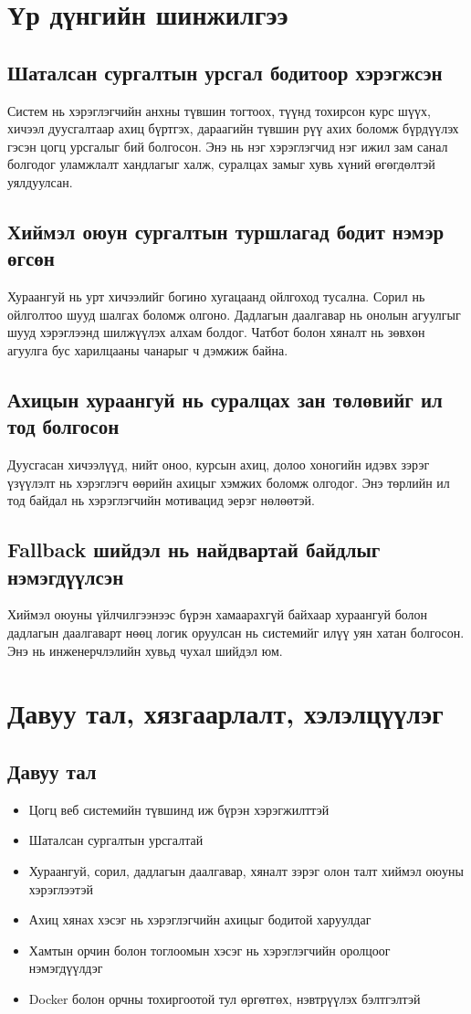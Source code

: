 \section{Үр дүнгийн шинжилгээ}
\subsection{Шаталсан сургалтын урсгал бодитоор хэрэгжсэн}
Систем нь хэрэглэгчийн анхны түвшин тогтоох, түүнд тохирсон курс шүүх, хичээл дуусгалтаар ахиц бүртгэх, дараагийн түвшин рүү ахих боломж бүрдүүлэх гэсэн цогц урсгалыг бий болгосон. Энэ нь нэг хэрэглэгчид нэг ижил зам санал болгодог уламжлалт хандлагыг халж, суралцах замыг хувь хүний өгөгдөлтэй уялдуулсан.

\subsection{Хиймэл оюун сургалтын туршлагад бодит нэмэр өгсөн}
Хураангуй нь урт хичээлийг богино хугацаанд ойлгоход тусална. Сорил нь ойлголтоо шууд шалгах боломж олгоно. Дадлагын даалгавар нь онолын агуулгыг шууд хэрэглээнд шилжүүлэх алхам болдог. Чатбот болон хяналт нь зөвхөн агуулга бус харилцааны чанарыг ч дэмжиж байна.

\subsection{Ахицын хураангуй нь суралцах зан төлөвийг ил тод болгосон}
Дуусгасан хичээлүүд, нийт оноо, курсын ахиц, долоо хоногийн идэвх зэрэг үзүүлэлт нь хэрэглэгч өөрийн ахицыг хэмжих боломж олгодог. Энэ төрлийн ил тод байдал нь хэрэглэгчийн мотивацид эерэг нөлөөтэй.

\subsection{Fallback шийдэл нь найдвартай байдлыг нэмэгдүүлсэн}
Хиймэл оюуны үйлчилгээнээс бүрэн хамаарахгүй байхаар хураангуй болон дадлагын даалгаварт нөөц логик оруулсан нь системийг илүү уян хатан болгосон. Энэ нь инженерчлэлийн хувьд чухал шийдэл юм.

\section{Давуу тал, хязгаарлалт, хэлэлцүүлэг}
\subsection{Давуу тал}
\begin{itemize}
\item Цогц веб системийн түвшинд иж бүрэн хэрэгжилттэй
\item Шаталсан сургалтын урсгалтай
\item Хураангуй, сорил, дадлагын даалгавар, хяналт зэрэг олон талт хиймэл оюуны хэрэглээтэй
\item Ахиц хянах хэсэг нь хэрэглэгчийн ахицыг бодитой харуулдаг
\item Хамтын орчин болон тоглоомын хэсэг нь хэрэглэгчийн оролцоог нэмэгдүүлдэг
\item Docker болон орчны тохиргоотой тул өргөтгөх, нэвтрүүлэх бэлтгэлтэй
\end{itemize}

